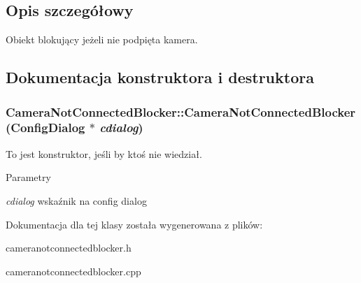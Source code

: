 \subsection{Opis szczegółowy}
Obiekt blokujący jeżeli nie podpięta kamera. 

\subsection{Dokumentacja konstruktora i destruktora}
\hypertarget{class_camera_not_connected_blocker_a36847155966f5fded3d9d5ae9a348be7}{
\subsubsection[{CameraNotConnectedBlocker}]{\setlength{\rightskip}{0pt plus 5cm}CameraNotConnectedBlocker::CameraNotConnectedBlocker ({\bf ConfigDialog} $\ast$ {\em cdialog})}}
\label{class_camera_not_connected_blocker_a36847155966f5fded3d9d5ae9a348be7}


To jest konstruktor, jeśli by ktoś nie wiedział. 


\begin{DoxyParams}{Parametry}
\item[{\em cdialog}]wskaźnik na config dialog \end{DoxyParams}


Dokumentacja dla tej klasy została wygenerowana z plików:\begin{DoxyCompactItemize}
\item 
cameranotconnectedblocker.h\item 
cameranotconnectedblocker.cpp\end{DoxyCompactItemize}
